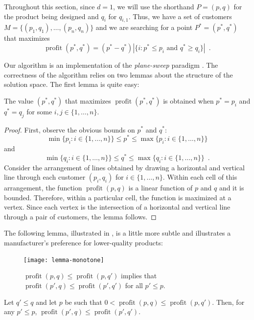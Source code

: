 \documentclass[lotsofwhite]{patmorin}
\newcommand{\val}{\operatorname{profit}}
\begin{document}
Throughout this section, since $d=1$, we will use the shorthand $P=(p,q)$
for the product being designed and $q_i$ for $q_{i,1}$.  Thus, we have a
set of customers $M=\{(p_1,q_1),\ldots,(p_{n},q_n)\}$ and we are searching
for a point $P^*=(p^*,q^*)$ that maximizes 
\[
   \val(p^*,q^*) = (p^*-q^*)
     |\{i : \mbox{$p^*\le p_i$ and $q^*\ge q_i$}\}|  \enspace .
\]

Our algorithm is an implementation of the \emph{plane-sweep} paradigm
\cite{bo79}. The correctness of the algorithm relies on two lemmas about
the structure of the solution space.  The first lemma is quite easy:
\begin{lem}
  The value $(p^*,q^*)$ that maximizes $\val(p^*,q^*)$ is obtained when
  $p^* = p_i$ and $q^*=q_j$ for some $i,j\in\{1,\ldots,n\}$.
\end{lem}

\begin{proof}
  First, observe the obvious bounds on $p^*$ and $q^*$:
  \[
     \min\{p_i:i\in\{1,\ldots,n\}\} \le p^* 
      \le \max\{p_i:i\in\{1,\ldots,n\}\} 
  \] 
  and 
  \[
     \min\{q_i:i\in\{1,\ldots,n\}\} \le q^* 
      \le \max\{q_i:i\in\{1,\ldots,n\}\} \enspace .
  \] 
  Consider the arrangement of lines obtained by drawing a
  horizontal and vertical line through each customer $(p_i,q_i)$
  for $i\in\{1,\ldots,n\}$.  Within each cell of this arrangement,
  the function $\val(p,q)$ is a linear function of $p$ and $q$ and it is
  bounded.  Therefore, within a particular cell, the function is maximized
  at a vertex.  Since each vertex is the intersection of a horizontal
  and vertical line through a pair of customers, the lemma follows.
\end{proof}

The following lemma, illustrated in , is a
little more subtle and illustrates a manufacturer's preference for
lower-quality products:
\begin{figure}
  \begin{center}
    \texttt{[image: lemma-monotone]}
  \end{center}
  \caption{$\val(p,q) \le \val(p,q')$ implies that $\val(p',q) \le
           \val(p',q')$ for all $p' \le p$.}
\end{figure}

\begin{lem}
  Let $q' \le q$ and let $p$ be such that $0 < \val(p,q) \le \val(p,q')$.
  Then, for any $p' \le p$, $\val(p',q) \le \val(p',q')$.
\end{lem}
\end{document}
